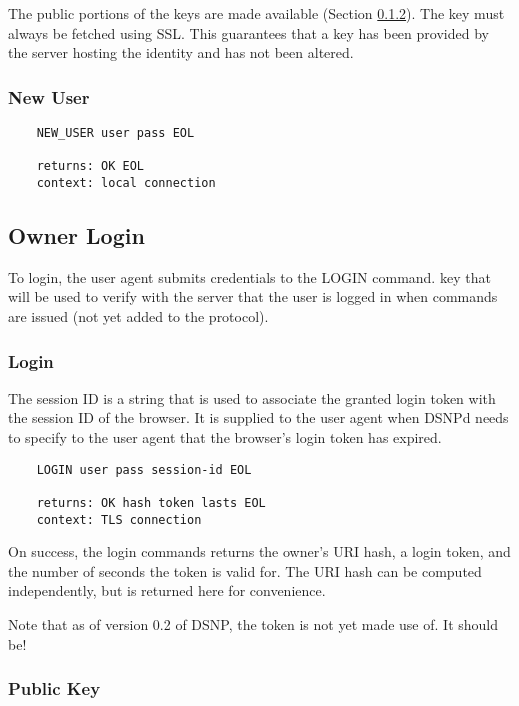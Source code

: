 \documentclass[letterpaper,11pt,oneside]{article}
\begin{document}
The public portions of the keys are made available (Section
\ref{public-key-command}). The key must always be fetched using SSL. This
guarantees that a key has been provided by the server hosting the identity and
has not been altered.

\subsubsection{New User}

\vspace{10pt}
\begin{verbatim}
    NEW_USER user pass EOL

    returns: OK EOL
    context: local connection
\end{verbatim}

\subsection{Owner Login}

To login, the user agent submits credentials to the LOGIN command. key that
will be used to verify with the server that the user is logged in when commands
are issued (not yet added to the protocol).

\subsubsection{Login}

The session ID is a string that is used to associate the granted login token
with the session ID of the browser. It is supplied to the user agent when DSNPd
needs to specify to the user agent that the browser's login token has expired.

\vspace{10pt}
\begin{verbatim}
    LOGIN user pass session-id EOL

    returns: OK hash token lasts EOL
    context: TLS connection
\end{verbatim}
\vspace{10pt}

On success, the login commands returns the owner's URI hash, a login token, and
the number of seconds the token is valid for. The URI hash can be computed
independently, but is returned here for convenience.

Note that as of version 0.2 of DSNP, the token is not yet made use of. It
should be!

\subsubsection{Public Key}
\label{public-key-command}
\end{document}
